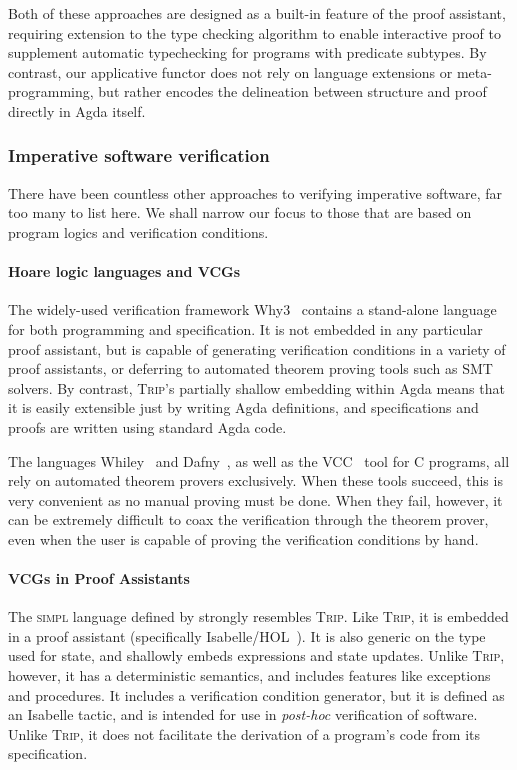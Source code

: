 \documentclass[sigplan,review]{acmart}\settopmatter{printfolios=true,printccs=false,printacmref=false}
\begin{document}
\noindent Both of these approaches are designed as a built-in feature of 
the proof assistant, requiring extension to the type checking algorithm to enable 
interactive proof to supplement automatic typechecking for programs with
 predicate subtypes. By contrast, our applicative functor does not rely on 
 language extensions or meta-programming, but rather encodes the delineation 
 between structure and proof directly in Agda itself.



\subsubsection{Imperative software verification}
There have been countless other approaches to verifying imperative software, far
too many to list here. We shall narrow our focus to those that are
based on program logics and verification conditions.

\paragraph{Hoare logic languages and VCGs}
The widely-used verification framework Why3~\citep{why3} contains a stand-alone language for both 
programming and specification. It is not embedded 
in any particular proof assistant, but is capable of generating verification 
conditions in a variety of proof assistants, or deferring to automated 
theorem proving tools such as SMT solvers. By contrast, \textsc{Trip}'s 
partially shallow embedding within Agda means that it is easily extensible 
just by writing Agda definitions, and specifications and proofs are written 
using standard Agda code.

The languages Whiley~\citep{whiley} and Dafny~\citep{dafny}, as well as the VCC~\citep{vcc}
tool for C programs, all rely on automated theorem provers exclusively.
When these tools succeed, this is very convenient as no manual proving must be done.
When they fail, however, it can be extremely difficult to coax the verification 
through the theorem prover, even when the user is capable of proving the
verification conditions by hand. 


\paragraph{VCGs in Proof Assistants}
The \textsc{simpl} language defined by \citet{simpl} strongly resembles \textsc{Trip}. Like 
\textsc{Trip}, it is embedded in a proof assistant (specifically Isabelle/HOL~\citep{isabelle}).
It is also generic on the type used for state, and shallowly 
embeds expressions and state updates. Unlike \textsc{Trip}, however, it has a 
deterministic semantics, and includes features like exceptions and procedures.
It includes a verification condition generator, but it is defined as an Isabelle
tactic, and is intended for use in \emph{post-hoc} verification of software. Unlike 
\textsc{Trip}, it does not facilitate the derivation of a program's code from its specification.
\end{document}
